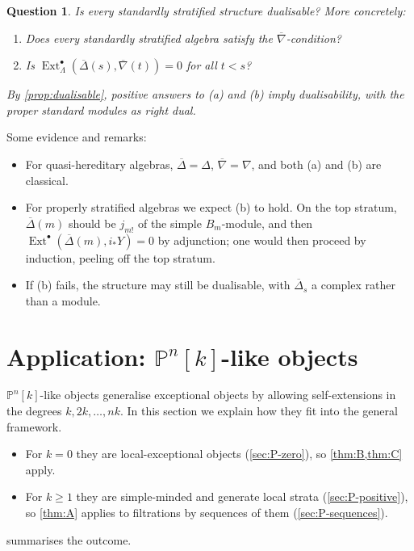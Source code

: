 \documentclass[11pt,reqno]{amsart}
\theoremstyle{plain}
\newtheorem{question}[theorem]{Question}
\theoremstyle{definition}
\theoremstyle{remark}
\DeclareMathOperator{\Ext}{Ext}
\newcommand{\Pn}[2]{\mathbb{P}^{#1}[#2]}
\newcommand{\nablabar}{\overline{\nabla}}
\newcommand{\Deltabar}{\overline{\Delta}}
\begin{document}
\begin{question}\label{q:HD4}
Is every standardly stratified structure dualisable? More concretely:
\begin{enumerate}
\item[(a)] Does every standardly stratified algebra satisfy the $\nablabar$-condition?
\item[(b)] Is $\Ext^\bullet_\Lambda(\Deltabar(s),\nablabar(t))=0$ for all $t<s$?
\end{enumerate}
By \cref{prop:dualisable}, positive answers to (a) and (b) imply dualisability, with the proper standard modules as right dual.
\end{question}

Some evidence and remarks:
\begin{itemize}
\item For quasi-hereditary algebras, $\Deltabar=\Delta$, $\nablabar=\nabla$, and both (a) and (b) are classical.
\item For properly stratified algebras we expect (b) to hold. On the top stratum, $\Deltabar(m)$ should be $j_{m!}$ of the simple $B_m$-module, and then $\Ext^\bullet(\Deltabar(m),i_*Y)=0$ by adjunction; one would then proceed by induction, peeling off the top stratum.
\item If (b) fails, the structure may still be dualisable, with $\Deltabar_s$ a complex rather than a module.
\end{itemize}

\section{Application: \texorpdfstring{$\mathbb{P}^n[k]$}{Pn[k]}-like objects}\label{sec:P-objects}

$\Pn nk$-like objects generalise exceptional objects by allowing self-extensions in the degrees $k,2k,\dots,nk$. In this section we explain how they fit into the general framework.
\begin{itemize}
\item For $k=0$ they are local-exceptional objects (\cref{sec:P-zero}), so \cref{thm:B,thm:C} apply.
\item For $k\ge1$ they are simple-minded and generate local strata (\cref{sec:P-positive}), so \cref{thm:A} applies to filtrations by sequences of them (\cref{sec:P-sequences}).
\end{itemize}
 summarises the outcome.
\end{document}
